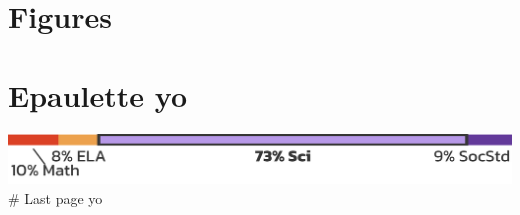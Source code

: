 \documentclass[utf8]{frontiersSCNS}
\begin{document}
\hypertarget{figures}{%
\section*{Figures}\label{figures}}

\hypertarget{epaulette-yo}{%
\section{Epaulette yo}\label{epaulette-yo}}

\includegraphics{GP-Learning-Epaulette.png} \# Last page yo
\end{document}
